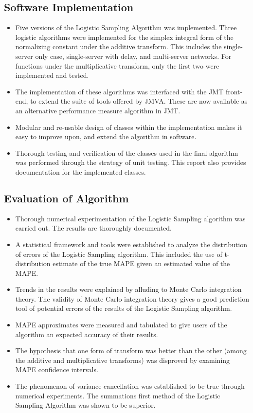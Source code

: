 \subsection{Software Implementation}
\begin{itemize}[leftmargin=*]
    \item Five versions of the Logistic Sampling Algorithm was implemented. Three logistic algorithms were implemented for the simplex integral form of the normalizing constant under the additive transform. This includes the single-server only case, single-server with delay, and multi-server networks. For functions under the multiplicative transform, only the first two were implemented and tested.
    \item The implementation of these algorithms was interfaced with the JMT front-end, to extend the suite of tools offered by JMVA. These are now available as an alternative performance measure algorithm in JMT.
    \item Modular and re-usable design of classes within the implementation makes it easy to improve upon, and extend the algorithm in software.
    \item Thorough testing and verification of the classes used in the final algorithm was performed through the strategy of unit testing. This report also provides documentation for the implemented classes.
\end{itemize}

\subsection{Evaluation of Algorithm}
\begin{itemize}[leftmargin=*]
    \item Thorough numerical experimentation of the Logistic Sampling algorithm was carried out. The results are thoroughly documented.
    \item A statistical framework and tools were established to analyze the distribution of errors of the Logistic Sampling algorithm. This included the use of t-distribution estimate of the true MAPE given an estimated value of the MAPE.
    \item Trends in the results were explained by alluding to Monte Carlo integration theory. The validity of Monte Carlo integration theory gives a good prediction tool of potential errors of the results of the Logistic Sampling algorithm.
    \item MAPE approximates were measured and tabulated to give users of the algorithm an expected accuracy of their results.
    \item The hypothesis that one form of transform was better than the other (among the additive and multiplicative transforms) was disproved by examining MAPE confidence intervals.
    \item The phenomenon of variance cancellation was established to be true through numerical experiments. The summations first method of the Logistic Sampling Algorithm was shown to be superior.
\end{itemize}

